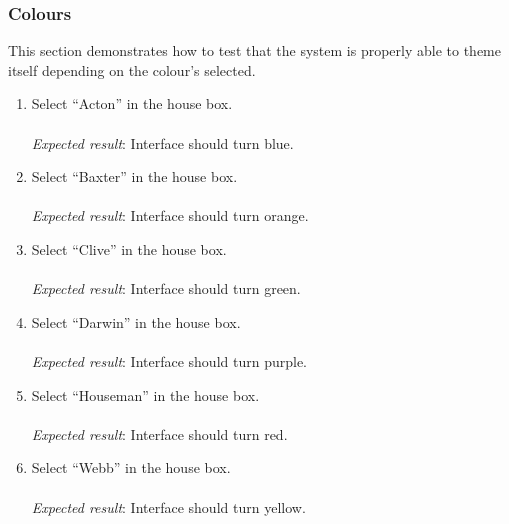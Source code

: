 \subsubsection{Colours} %
\label{ssub:colours}
This section demonstrates how to test that the system is properly able to theme itself depending on the colour's selected.
\begin{enumerate}
\item Select ``Acton'' in the house box.\\\\
\textit{Expected result}: Interface should turn blue.\\

\item Select ``Baxter'' in the house box.\\\\
\textit{Expected result}: Interface should turn orange.\\

\item Select ``Clive'' in the house box.\\\\
\textit{Expected result}: Interface should turn green.\\

\item Select ``Darwin'' in the house box.\\\\
\textit{Expected result}: Interface should turn purple.\\

\item Select ``Houseman'' in the house box.\\\\
\textit{Expected result}: Interface should turn red.\\

\item Select ``Webb'' in the house box.\\\\
\textit{Expected result}: Interface should turn yellow.
\end{enumerate}

